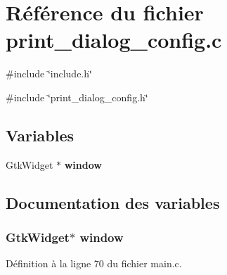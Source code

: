 \section{Référence du fichier print\_\-dialog\_\-config.c}
\label{print__dialog__config_8c}
{\ttfamily \#include \char`\"{}include.h\char`\"{}}\par
{\ttfamily \#include \char`\"{}print\_\-dialog\_\-config.h\char`\"{}}\par
\subsection*{Variables}
\begin{DoxyCompactItemize}
\item 
GtkWidget $\ast$ {\bf window}
\end{DoxyCompactItemize}


\subsection{Documentation des variables}
\subsubsection[{window}]{\setlength{\rightskip}{0pt plus 5cm}GtkWidget$\ast$ {\bf window}}\label{print__dialog__config_8c_a3d346c08cf2d67c388caabffb412b293}


Définition à la ligne 70 du fichier main.c.

